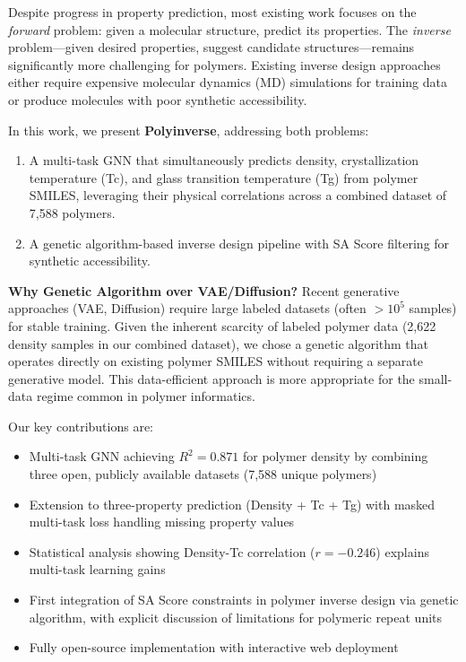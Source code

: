 \documentclass{article}
\begin{document}
Despite progress in property prediction, most existing work focuses on the
\textit{forward} problem: given a molecular structure, predict its properties.
The \textit{inverse} problem---given desired properties, suggest candidate
structures---remains significantly more challenging for polymers.
Existing inverse design approaches either require expensive molecular dynamics
(MD) simulations for training data \citep{vitrimer_inverse_2023} or produce
molecules with poor synthetic accessibility.

In this work, we present \textbf{Polyinverse}, addressing both problems:
\begin{enumerate}
    \item A multi-task GNN that simultaneously predicts density, crystallization
    temperature (Tc), and glass transition temperature (Tg) from polymer SMILES,
    leveraging their physical correlations across a combined dataset of 7,588 polymers.
    \item A genetic algorithm-based inverse design pipeline with SA Score
    \citep{ertl_sa_score_2009} filtering for synthetic accessibility.
\end{enumerate}

\noindent\textbf{Why Genetic Algorithm over VAE/Diffusion?}
Recent generative approaches (VAE, Diffusion) require large labeled datasets
(often $>10^5$ samples) for stable training. Given the inherent scarcity of
labeled polymer data (2,622 density samples in our combined dataset), we chose a
genetic algorithm that operates directly on existing polymer SMILES without
requiring a separate generative model. This data-efficient approach is more
appropriate for the small-data regime common in polymer informatics.

\noindent Our key contributions are:
\begin{itemize}
    \item Multi-task GNN achieving $R^2=0.871$ for polymer density by combining
    three open, publicly available datasets (7,588 unique polymers)
    \item Extension to three-property prediction (Density + Tc + Tg) with
    masked multi-task loss handling missing property values
    \item Statistical analysis showing Density-Tc correlation ($r=-0.246$)
    explains multi-task learning gains
    \item First integration of SA Score constraints in polymer inverse design
    via genetic algorithm, with explicit discussion of limitations for
    polymeric repeat units
    \item Fully open-source implementation with interactive web deployment
\end{itemize}
\end{document}

